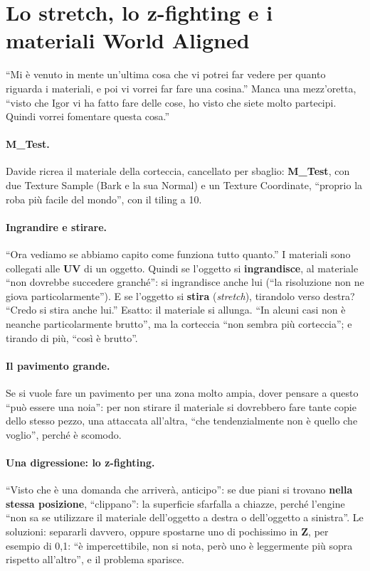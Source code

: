 \section{Lo stretch, lo z-fighting e i materiali World Aligned}
\label{ue3:sec:world}

``Mi è venuto in mente un'ultima cosa che vi potrei far vedere per quanto riguarda i
materiali, e poi vi vorrei far fare una cosina.'' Manca una mezz'oretta, ``visto che
Igor vi ha fatto fare delle cose, ho visto che siete molto partecipi. Quindi vorrei
fomentare questa cosa.''

\paragraph{M\_Test.} Davide ricrea il materiale della corteccia, cancellato per sbaglio:
\textbf{M\_Test}, con due Texture Sample (Bark e la sua Normal) e un Texture
Coordinate, ``proprio la roba più facile del mondo'', con il tiling a 10.

\paragraph{Ingrandire e stirare.} ``Ora vediamo se abbiamo capito come funziona tutto
quanto.'' I materiali sono collegati alle \textbf{UV} di un oggetto. Quindi se
l'oggetto si \textbf{ingrandisce}, al materiale ``non dovrebbe succedere granché'': si
ingrandisce anche lui (``la risoluzione non ne giova particolarmente''). E se l'oggetto
si \textbf{stira} (\emph{stretch}), tirandolo verso destra? ``Credo si stira anche
lui.'' Esatto: il materiale si allunga. ``In alcuni casi non è neanche particolarmente
brutto'', ma la corteccia ``non sembra più corteccia''; e tirando di più, ``così è
brutto''.

\paragraph{Il pavimento grande.} Se si vuole fare un pavimento per una zona molto
ampia, dover pensare a questo ``può essere una noia'': per non stirare il materiale si
dovrebbero fare tante copie dello stesso pezzo, una attaccata all'altra, ``che
tendenzialmente non è quello che voglio'', perché è scomodo.

\paragraph{Una digressione: lo z-fighting.} ``Visto che è una domanda che arriverà,
anticipo'': se due piani si trovano \textbf{nella stessa posizione}, ``clippano'': la
superficie sfarfalla a chiazze, perché l'engine ``non sa se utilizzare il materiale
dell'oggetto a destra o dell'oggetto a sinistra''. Le soluzioni: separarli davvero,
oppure spostarne uno di pochissimo in \textbf{Z}, per esempio di 0,1: ``è
impercettibile, non si nota, però uno è leggermente più sopra rispetto all'altro'', e il
problema sparisce.

